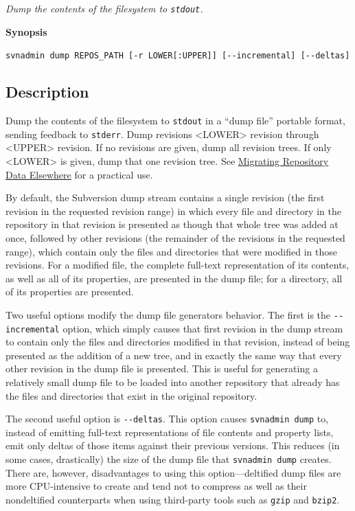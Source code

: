 \emph{Dump the contents of the filesystem to \texttt{stdout}.}

\textbf{Synopsis}

\texttt{svnadmin\ dump\ REPOS\_PATH\ {[}-r\ LOWER{[}:UPPER{]}{]}\ {[}-\/-incremental{]}\ {[}-\/-deltas{]}}

\subsection{Description}

Dump the contents of the filesystem to \texttt{stdout} in a ``dump
file'' portable format, sending feedback to \texttt{stderr}. Dump
revisions \textless LOWER\textgreater{} revision through
\textless UPPER\textgreater{} revision. If no revisions are given, dump
all revision trees. If only \textless LOWER\textgreater{} is given, dump
that one revision tree. See
\hyperref[svn.reposadmin.maint.migrate]{Migrating Repository Data
Elsewhere} for a practical use.

By default, the Subversion dump stream contains a single revision (the
first revision in the requested revision range) in which every file and
directory in the repository in that revision is presented as though that
whole tree was added at once, followed by other revisions (the remainder
of the revisions in the requested range), which contain only the files
and directories that were modified in those revisions. For a modified
file, the complete full-text representation of its contents, as well as
all of its properties, are presented in the dump file; for a directory,
all of its properties are presented.

Two useful options modify the dump file generator\textquotesingle s
behavior. The first is the \texttt{-\/-incremental} option, which simply
causes that first revision in the dump stream to contain only the files
and directories modified in that revision, instead of being presented as
the addition of a new tree, and in exactly the same way that every other
revision in the dump file is presented. This is useful for generating a
relatively small dump file to be loaded into another repository that
already has the files and directories that exist in the original
repository.

The second useful option is \texttt{-\/-deltas}. This option causes
\texttt{svnadmin\ dump} to, instead of emitting full-text
representations of file contents and property lists, emit only deltas of
those items against their previous versions. This reduces (in some
cases, drastically) the size of the dump file that
\texttt{svnadmin\ dump} creates. There are, however, disadvantages to
using this option---deltified dump files are more CPU-intensive to
create and tend not to compress as well as their nondeltified
counterparts when using third-party tools such as \texttt{gzip} and
\texttt{bzip2}.

